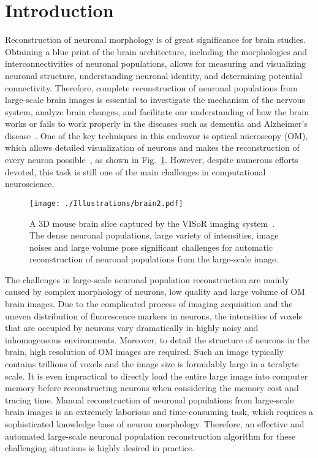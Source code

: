 \section{Introduction}
\label{sec:introduction}

Reconstruction of neuronal morphology is of great significance for brain studies. Obtaining a blue print of the brain architecture, including the morphologies and interconnectivities of neuronal populations, allows for measuring and visualizing neuronal structure, understanding neuronal identity, and determining potential connectivity.
Therefore, complete reconstruction of neuronal populations from large-scale brain images is essential to investigate the mechanism of the nervous system, analyze brain changes, and facilitate our understanding of how the brain works or fails to work properly in the diseases such as dementia and Alzheimer's disease~\cite{Petrella2003, Giorgio2013}.
One of the key techniques in this endeavor is optical microscopy (OM), which allows detailed visualization of neurons and makes the reconstruction of every neuron possible~\cite{Senft2011}, as shown in Fig.~\ref{fig:brain}.
However, despite numerous efforts devoted, this task is still one of the main challenges in computational neuroscience.

\begin{figure}[t]
	\centering
	\texttt{[image: ./Illustrations/brain2.pdf]}
	\caption{A 3D mouse brain slice captured by the VISoR imaging system~\cite{Wang2019}. The dense neuronal populations, large variety of intensities, image noises and large volume pose significant challenges for automatic reconstruction of neuronal populations from the large-scale image.}	
	\label{fig:brain}
\end{figure}

The challenges in large-scale neuronal population reconstruction are mainly caused by complex morphology of neurons, low quality and large volume of OM brain images.
Due to the complicated process of imaging acquisition and the uneven distribution of fluorescence markers in neurons, the intensities of voxels that are occupied by neurons vary dramatically in highly noisy and inhomogeneous environments.
Moreover, to detail the structure of neurons in the brain, high resolution of OM images are required. Such an image typically contains trillions of voxels and the image size is formidably large in a terabyte scale. It is even impractical to directly load the entire large image into computer memory before reconstructing neurons when considering the memory cost and tracing time.
Manual reconstruction of neuronal populations from large-scale brain images is an extremely laborious and time-consuming task, which requires a sophisticated knowledge base of neuron morphology.
Therefore, an effective and automated large-scale neuronal population reconstruction algorithm for these challenging situations is highly desired in practice.


